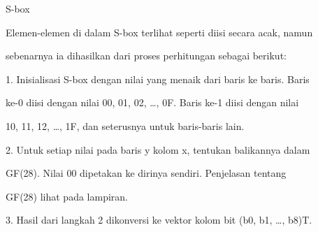 \documentclass{article}
\begin{document}

S-box

Elemen-elemen di dalam S-box terlihat seperti diisi secara acak, namun 

sebenarnya ia dihasilkan dari proses perhitungan sebagai berikut:

1. Inisialisasi S-box dengan nilai yang menaik dari baris ke baris. Baris 

ke-0 diisi dengan nilai 00, 01, 02, …, 0F. Baris ke-1 diisi dengan nilai 

10, 11, 12, …, 1F, dan seterusnya untuk baris-baris lain.

2. Untuk setiap nilai pada baris y kolom x, tentukan balikannya dalam 

GF(28). Nilai 00 dipetakan ke dirinya sendiri. Penjelasan tentang 

GF(28) lihat pada lampiran.

3. Hasil dari langkah 2 dikonversi ke vektor kolom bit (b0, b1, …, b8)T.
\end{document}
